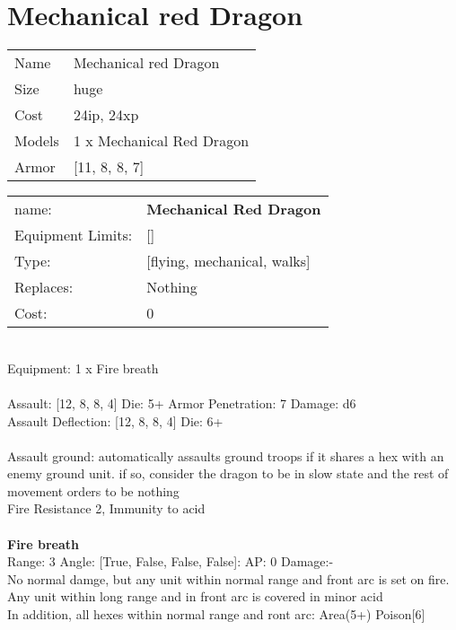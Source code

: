 \pagebreak

\section{ Mechanical red Dragon }

\begin{tabular}{ll}
  Name & Mechanical red Dragon \\
  Size & huge\\
  Cost & 24ip, 24xp\\
  Models & 1 x Mechanical Red Dragon\\
  Armor & [11, 8, 8, 7]\\
\end{tabular}

\noindent 

\noindent
\begin{tabular}{ll}
name: &{\bf Mechanical Red Dragon } \\
Equipment Limits: &[] \\
Type: &[flying, mechanical, walks] \\
Replaces: &Nothing \\
Cost: & 0\\
\end{tabular}
\ \\
Equipment: 1 x Fire breath \\
\ \\
Assault: [12, 8, 8, 4] Die: 5+ Armor Penetration: 7 Damage: d6 \\
Assault Deflection: [12, 8, 8, 4] Die: 6+\\
\indent  
\ \\
Assault ground: automatically assaults ground troops if it shares a hex with an enemy ground unit. if so, consider the dragon to be in slow state and the rest of movement orders to be nothing\\ 
Fire Resistance 2, Immunity to acid\\ 

\ \\
{\bf Fire breath } \\



Range: 3  Angle: [True, False, False, False]: AP: 0 Damage:- \\
No normal damge, but any unit within normal range and front arc is set on fire. Any unit within long range and in front arc is covered in minor acid\\ 
In addition, all hexes within normal range and ront arc: Area(5+) Poison[6]\\ 




